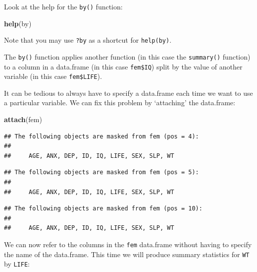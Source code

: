 \documentclass[12pt,]{book}
\newenvironment{Shaded}{\begin{snugshade}}{\end{snugshade}}
\newcommand{\KeywordTok}[1]{\textcolor[rgb]{0.13,0.29,0.53}{\textbf{#1}}}
\newcommand{\OperatorTok}[1]{\textcolor[rgb]{0.81,0.36,0.00}{\textbf{#1}}}
\newcommand{\NormalTok}[1]{#1}
\theoremstyle{definition}
\theoremstyle{definition}
\theoremstyle{definition}
\theoremstyle{remark}
\begin{document}
\begin{Shaded}
\end{Shaded}

Look at the help for the \texttt{by()} function:

\begin{Shaded}
\begin{Highlighting}[]
\KeywordTok{help}\NormalTok{(by)}
\end{Highlighting}
\end{Shaded}

Note that you may use \texttt{?by} as a shortcut for \texttt{help(by)}.

The \texttt{by()} function applies another function (in this case the
\texttt{summary()} function) to a column in a data.frame (in this case
\texttt{fem\$IQ}) split by the value of another variable (in this case
\texttt{fem\$LIFE}).

It can be tedious to always have to specify a data.frame each time we
want to use a particular variable. We can fix this problem by
`attaching' the data.frame:

\begin{Shaded}
\begin{Highlighting}[]
\KeywordTok{attach}\NormalTok{(fem)}
\end{Highlighting}
\end{Shaded}

\begin{verbatim}
## The following objects are masked from fem (pos = 4):
## 
##     AGE, ANX, DEP, ID, IQ, LIFE, SEX, SLP, WT
\end{verbatim}

\begin{verbatim}
## The following objects are masked from fem (pos = 5):
## 
##     AGE, ANX, DEP, ID, IQ, LIFE, SEX, SLP, WT
\end{verbatim}

\begin{verbatim}
## The following objects are masked from fem (pos = 10):
## 
##     AGE, ANX, DEP, ID, IQ, LIFE, SEX, SLP, WT
\end{verbatim}

We can now refer to the columns in the \texttt{fem} data.frame without
having to specify the name of the data.frame. This time we will produce
summary statistics for \texttt{WT} by \texttt{LIFE}:
\end{document}
